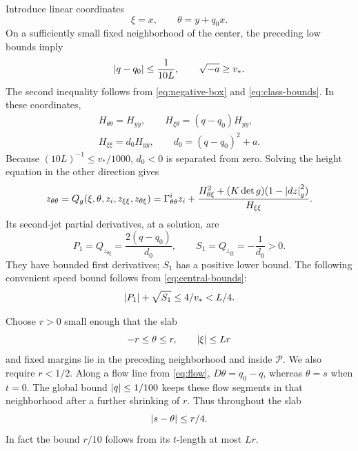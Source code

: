 Introduce linear coordinates
\begin{equation}\label{eq:shear}
\xi=x,\qquad \theta=y+q_0x.
\end{equation}
On a sufficiently small fixed neighborhood of the center, the
preceding low bounds imply
\begin{equation}\label{eq:central-bounds}
\left\lvert q-q_0\right\rvert\le\frac1{10L},
\qquad \sqrt{-a}\ge v_*.
\end{equation}
The second inequality follows from \eqref{eq:negative-box}
and \eqref{eq:class-bounds}. In these coordinates,
\begin{equation}\label{eq:sheared-hessian}
\begin{gathered}
H_{\theta\theta}=H_{yy},\qquad
H_{\xi\theta}=(q-q_0)H_{yy},\\
H_{\xi\xi}=d_0H_{yy},\qquad d_0=(q-q_0)^2+a.
\end{gathered}
\end{equation}
Because \((10L)^{-1}\le v_*/1000\), \(d_0<0\) is separated
from zero. Solving the height equation in the other direction gives
\begin{equation}\label{eq:Q}
z_{\theta\theta}
=Q_g(\xi,\theta,z_i,z_{\xi\xi},z_{\theta\xi})
=\Gamma^i_{\theta\theta}z_i+
\frac{H_{\theta\xi}^2+(K\det g)(1-\left\lvert dz\right\rvert_g^2)}
     {H_{\xi\xi}}.
\end{equation}
Its second-jet partial derivatives, at a solution, are
\begin{equation}\label{eq:hyperbolic-coefficients}
P_1=Q_{z_{\theta\xi}}=\frac{2(q-q_0)}{d_0},
\qquad S_1=Q_{z_{\xi\xi}}=-\frac1{d_0}>0.
\end{equation}
They have bounded first derivatives; \(S_1\) has a positive lower
bound. The following convenient speed bound follows from
\eqref{eq:central-bounds}:
\begin{equation}\label{eq:speed-bound}
\left\lvert P_1\right\rvert+\sqrt{S_1}\le4/v_*<L/4.
\end{equation}

Choose \(r>0\) small enough that the slab
\begin{equation}\label{eq:slab}
-r\le\theta\le r,\qquad \left\lvert\xi\right\rvert\le Lr
\end{equation}
and fixed margins lie in the preceding neighborhood and inside
\(\mathcal P\). We also require \(r<1/2\).
Along a flow line from \eqref{eq:flow},
\(D\theta=q_0-q\), whereas \(\theta=s\) when \(t=0\).
The global bound \(\left\lvert q\right\rvert\le1/100\) keeps these flow segments
in that neighborhood after a further shrinking of \(r\). Thus throughout
the slab
\begin{equation}\label{eq:s-theta}
\left\lvert s-\theta\right\rvert\le r/4.
\end{equation}
In fact the bound \(r/10\) follows from its \(t\)-length at most \(Lr\).

